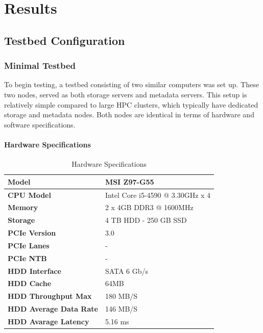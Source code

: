 \chapter{Results}

\section{Testbed Configuration}

\subsection{Minimal Testbed}

To begin testing, a testbed consisting of two similar computers was set up. These two nodes, served as both storage servers and metadata servers. This setup is relatively simple compared to large HPC clusters, which typically have dedicated storage and metadata nodes. Both nodes are identical in terms of hardware and software specifications.

\subsubsection{Hardware Specifications}
\begin{table}[H]
    \centering
    \caption{Hardware Specifications}
    \label{tab:node_specs}
    \begin{tabularx}{\textwidth}{|X|X|}
        \hline
        \textbf{Model} & MSI Z97-G55 \\
        \hline
        \textbf{CPU Model} & Intel Core i5-4590 @ 3.30GHz x 4 \\
        \hline
        \textbf{Memory} & 2 x 4GB DDR3 @ 1600MHz \\
        \hline
        \textbf{Storage} & 4 TB HDD - 250 GB SSD\\
        \hline
        \textbf{PCIe Version} & 3.0 \\
        \hline
        \textbf{PCIe Lanes} & - \\
        \hline
        \textbf{PCIe NTB} & - \\
        \hline
        \textbf{HDD Interface} & SATA 6 Gb/s \\
        \hline
        \textbf{HDD Cache} & 64MB \\
        \hline
        \textbf{HDD Throughput Max} & 180 MB/S \\
        \hline
        \textbf{HDD Average Data Rate} & 146 MB/S \\
        \hline
        \textbf{HDD Avarage Latency} & 5.16 ms \\
        \hline
    \end{tabularx}
\end{table}

